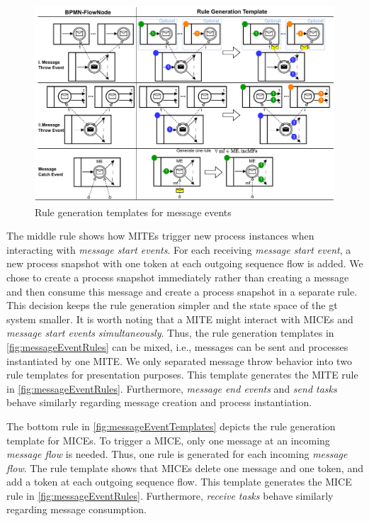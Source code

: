 \documentclass[runningheads]{llncs}
\begin{document}
\begin{figure}[ht]
    \centering
    \includegraphics[width=1\textwidth]{images/bpmn_semantics-message_templates.pdf}
    \caption{Rule generation templates for message events}
    \label{fig:messageEventTemplates}
\end{figure}

The middle rule shows how MITEs trigger new process instances when interacting with \textit{message start events}.
For each receiving \textit{message start event}, a new process snapshot with one token at each outgoing sequence flow is added.
We chose to create a process snapshot immediately rather than creating a message and then consume this message and create a process snapshot in a separate rule.
This decision keeps the rule generation simpler and the state space of the \gls*{gt} system smaller.
It is worth noting that a MITE might interact with MICEs and \textit{message start events} \textit{simultaneously}.
Thus, the rule generation templates in \autoref{fig:messageEventRules} can be mixed, i.e., messages can be sent and processes instantiated by one MITE.
We only separated message throw behavior into two rule templates for presentation purposes.
This template generates the MITE rule in \autoref{fig:messageEventRules}.
Furthermore, \textit{message end events} and \textit{send tasks} behave similarly regarding message creation and process instantiation.

The bottom rule in \autoref{fig:messageEventTemplates} depicts the rule generation template for MICEs.
To trigger a MICE, only one message at an incoming \textit{message flow} is needed.
Thus, one rule is generated for each incoming \textit{message flow}.
The rule template shows that MICEs delete one message and one token, and add a token at each outgoing sequence flow.
This template generates the MICE rule in \autoref{fig:messageEventRules}.
Furthermore, \textit{receive tasks} behave similarly regarding message consumption.
\end{document}
